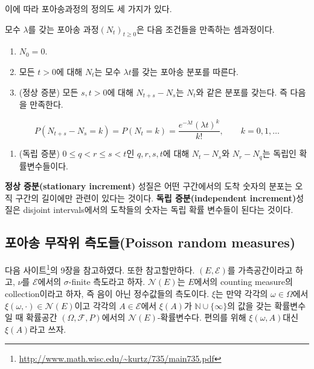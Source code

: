 \documentclass[b5paper,]{scrbook}
\providecommand{\tightlist}{%
  \setlength{\itemsep}{0pt}\setlength{\parskip}{0pt}}
\theoremstyle{plain}
\theoremstyle{definition}
\numberwithin{equation}{section}
\renewcommand{\href}[2]{#2\footnote{\url{#1}}}
\let\BeginKnitrBlock\begin \let\EndKnitrBlock\end
\begin{document}
이에 따라 포아송과정의 정의도 세 가지가 있다.

\BeginKnitrBlock{definition}[포아송과정 (정의1)]
\protect\hypertarget{def:unnamed-chunk-153}{}{\label{def:unnamed-chunk-153} {} }모수 \(\lambda\)를 갖는 포아송 과정\((N_{t})_{t\geq 0}\)은 다음 조건들을 만족하는 셈과정이다.

\begin{enumerate}
\def\labelenumi{\arabic{enumi}.}
\item
  \(N_{0}=0\).
\item
  모든 \(t>0\)에 대해 \(N_{t}\)는 모수 \(\lambda t\)를 갖는 포아송 분포를 따른다.
\item
  (정상 증분) 모든 \(s,t>0\)에 대해 \(N_{t+s}-N_{s}\)는 \(N_{t}\)와 같은 분포를 갖는다. 즉 다음을 만족한다.
\end{enumerate}

\[P(N_{t+s}-N_{s} = k) = P(N_{t} = k) = \frac{e^{-\lambda t}(\lambda t)^{k}}{k!},\qquad{k=0,1,\ldots}\]

\begin{enumerate}
\def\labelenumi{\arabic{enumi}.}
\setcounter{enumi}{3}
\tightlist
\item
  (독립 증분) \(0\leq q < r \leq s < t\)인 \(q,r,s,t\)에 대해 \(N_{t}-N_{s}\)와 \(N_{r}-N_{q}\)는 독립인 확률변수들이다.
\end{enumerate}
\EndKnitrBlock{definition}

\textbf{정상 증분(stationary increment)} 성질은 어떤 구간에서의 도착 숫자의 분포는 오직 구간의 길이에만 관련이 있다는 것이다. \textbf{독립 증분(independent increment)}성질은 disjoint intervals에서의 도착들의 숫자는 독립 확률 변수들이 된다는 것이다.

\hypertarget{--poisson-random-measures}{%
\subsection{포아송 무작위 측도들(Poisson random measures)}\label{--poisson-random-measures}}

다음 \href{http://www.math.wisc.edu/~kurtz/735/main735.pdf}{사이트}의 9장을 참고하였다. \citep{Mikhail2014} 또한 참고할만하다. \((E,\mathcal{E})\)를 가측공간이라고 하고, \(\nu\)를 \(\mathcal{E}\)에서의 \(\sigma\)-finite 측도라고 하자. \(\mathcal{N}(E)\)는 \(E\)에서의 counting measure의 collection이라고 하자, 즉 음이 아닌 정수값들의 측도이다. \(\xi\)는 만약 각각의 \(\omega \in \Omega\)에서 \(\xi(\omega, \cdot)\in\mathcal{N}(E)\)이고 각각의 \(A\in\mathcal{E}\)에서 \(\xi(A)\)가 \(\mathbb{N}\cup\{\infty\}\)의 값을 갖는 확률변수일 때 확률공간 \((\Omega, \mathcal{F}, P)\)에서의 \(\mathcal{N}(E)\)-확률변수다. 편의를 위해 \(\xi(\omega, A)\)대신 \(\xi(A)\)라고 쓰자.
\end{document}
